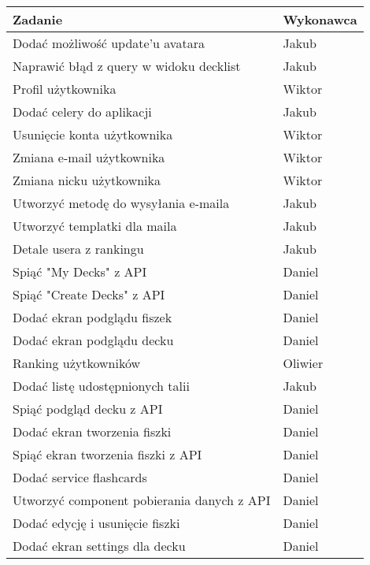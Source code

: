 \begin{table}[H]
\centering
\begin{tabularx}{\textwidth}{|p{}|X|}
    \hline
    \textbf{Zadanie} & \textbf{Wykonawca} \\
    \hline
    [MOBILE] Dodać możliwość update'u avatara & Jakub \\
    \hline
    [MOBILE] Naprawić błąd z query w widoku decklist & Jakub \\
    \hline
    [WEB] Profil użytkownika & Wiktor \\
    \hline
    [BACKEND] Dodać celery do aplikacji & Jakub \\
    \hline
    [WEB] Usunięcie konta użytkownika & Wiktor \\
    \hline
    [WEB] Zmiana e-mail użytkownika & Wiktor \\
    \hline
    [WEB] Zmiana nicku użytkownika & Wiktor \\
    \hline
    [BACKEND] Utworzyć metodę do wysyłania e-maila & Jakub \\
    \hline
    [BACKEND] Utworzyć templatki dla maila & Jakub \\
    \hline
    [MOBILE] Detale usera z rankingu & Jakub \\
    \hline
    [MOBILE] Spiąć "My Decks" z API & Daniel \\
    \hline
    [MOBILE] Spiąć "Create Decks" z API & Daniel \\
    \hline
    [MOBILE] Dodać ekran podglądu fiszek & Daniel \\
    \hline
    [MOBILE] Dodać ekran podglądu decku & Daniel \\
    \hline
    [WEB] Ranking użytkowników & Oliwier \\
    \hline
    [MOBILE] Dodać listę udostępnionych talii & Jakub \\
    \hline
    [MOBILE] Spiąć podgląd decku z API & Daniel \\
    \hline
    [MOBILE] Dodać ekran tworzenia fiszki & Daniel \\
    \hline
    [MOBILE] Spiąć ekran tworzenia fiszki z API & Daniel \\
    \hline
    [MOBILE] Dodać service flashcards & Daniel \\
    \hline
    [MOBILE] Utworzyć component pobierania danych z API & Daniel \\
    \hline
    [MOBILE] Dodać edycję i usunięcie fiszki & Daniel \\
    \hline
    [MOBILE] Dodać ekran settings dla decku & Daniel \\

\end{tabularx}
\end{table}
